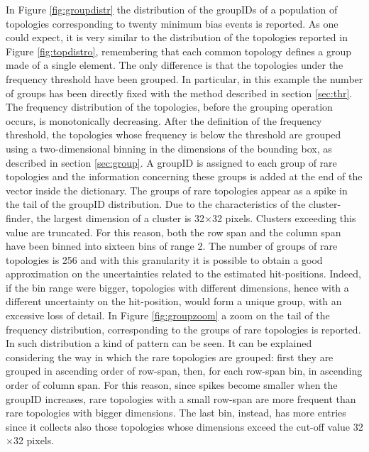 In Figure \ref{fig:groupdistr} the distribution of the groupIDs of a population of topologies corresponding to twenty minimum bias events is reported. As one could expect, it is very similar to the distribution of the topologies reported in Figure \ref{fig:topdistro}, remembering that each common topology defines a group made of a single element. The only difference is that the topologies under the frequency threshold have been grouped. In particular, in this example the number of groups has been directly fixed with the method described in section \ref{sec:thr}. The frequency distribution of the topologies, before the grouping operation occurs, is monotonically decreasing. After the definition of the frequency threshold, the topologies whose frequency is below the threshold are grouped using a two-dimensional binning in the dimensions of the bounding box, as described in section \ref{sec:group}. A groupID is assigned to each group of rare topologies and the information concerning these groups is added at the end of the vector inside the dictionary. The groups of rare topologies appear as a spike in the tail of the groupID distribution. Due to the characteristics of the cluster-finder, the largest dimension of a cluster is 32$\times$32 pixels. Clusters exceeding this value are truncated. For this reason, both the row span and the column span have been binned into sixteen bins of range 2. The number of groups of rare topologies is 256 and with this granularity it is possible to obtain a good approximation on the uncertainties related to the estimated hit-positions. Indeed, if the bin range were bigger, topologies with different dimensions, hence with a different uncertainty on the hit-position, would form a unique group, with an excessive loss of detail. In Figure \ref{fig:groupzoom} a zoom on the tail of the frequency distribution, corresponding to the groups of rare topologies is reported. In such distribution a kind of pattern can be seen. It can be explained considering the way in which the rare topologies are grouped: first they are grouped in ascending order of row-span, then, for each row-span bin, in ascending order of column span. For this reason, since spikes become smaller when the groupID increases, rare topologies with a small row-span are more frequent than rare topologies with bigger dimensions. The last bin, instead, has more entries since it collects also those topologies whose dimensions exceed the cut-off value 32$\times$32 pixels.
